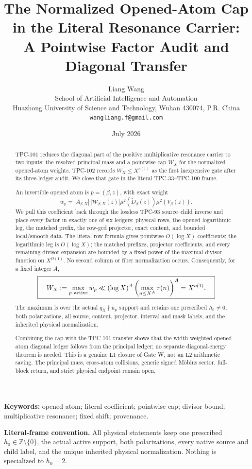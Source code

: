 \documentclass[11pt]{article}
\title{\textbf{The Normalized Opened-Atom Cap}\\
\textbf{in the Literal Resonance Carrier:}\\
A Pointwise Factor Audit and Diagonal Transfer}
\author{Liang Wang\\
School of Artificial Intelligence and Automation\\
Huazhong University of Science and Technology, Wuhan 430074, P.R. China\\
\texttt{wangliang.f@gmail.com}}
\date{July 2026}
\theoremstyle{definition}
\theoremstyle{remark}
\newcommand{\Z}{\mathbb Z}
\newcommand{\Lone}{\mathrm{L1}}
\newcommand{\Ltwo}{\mathrm{L2}}
\begin{document}
\maketitle

\begin{abstract}
TPC-101 reduces the diagonal part of the positive multiplicative
resonance carrier to two inputs: the resolved principal mass and a
pointwise cap \(W_X\) for the normalized opened-atom weights.
TPC-102 records \(W_X\le X^{o(1)}\) as the first inexpensive gate
after its three-ledger audit.  We close that gate in the literal
TPC-33--TPC-100 frame.

An invertible opened atom is \(p=(\beta,z)\), with exact weight
\[
 w_p
 =
 |A_{\beta,X}|\,|\mathcal W_{\beta,X}(z)|
 \mu^2(\widetilde D_\beta(z))\mu^2(V_\beta(z)).
\]
We pull this coefficient back through the lossless TPC-93
source--child inverse and place every factor in exactly one of six
ledgers: physical rows, the opened logarithmic leg, the matched
prefix, the row-gcd projector, exact content, and bounded
local/smooth data.  The literal row formula gives pointwise
\(O(\log X)\) coefficients; the logarithmic leg is \(O(\log X)\);
the matched prefixes, projector coefficients, and every remaining
divisor expansion are bounded by a fixed power of the maximal
divisor function on \(X^{O(1)}\).  No second column or fiber
normalization occurs.  Consequently, for a fixed integer \(A\),
\[
 \boxed{\quad
 W_X:=\max_{p\ {\rm active}}w_p
 \ll
 (\log X)^A
 \left(\max_{n\le X^{A}}\tau(n)\right)^A
 =X^{o(1)}.\quad}
\]
The maximum is over the actual \(q_X\nmid u_p\) support and retains
one prescribed \(h_0\ne0\), both polarizations, all source,
content, projector, interval and mask labels, and the inherited
physical normalization.

Combining the cap with the TPC-101 transfer shows that the
width-weighted opened-atom diagonal ledger follows from the
principal ledger; no separate diagonal-energy theorem is needed.
This is a genuine \(\Lone\) closure of Gate W, not an \(\Ltwo\)
arithmetic saving.  The principal mass, cross-atom collisions,
generic signed M\"obius sector, full-block return, and strict
physical endpoint remain open.
\end{abstract}

\noindent\textbf{Keywords:}
opened atom; literal coefficient; pointwise cap; divisor bound;
multiplicative resonance; fixed shift; provenance.

\medskip
\noindent\textbf{Literal-frame convention.}
All physical statements keep one prescribed \(h_0\in\Z\setminus
\{0\}\), the actual active support, both polarizations, every native
source and child label, and the unique inherited physical
normalization.  Nothing is specialized to \(h_0=2\).
\end{document}
